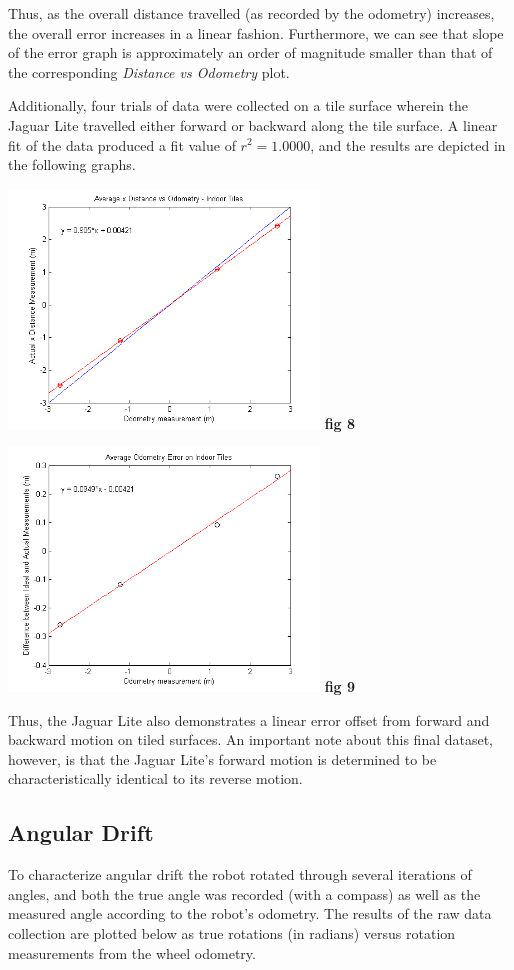 \documentclass[conference]{IEEEtran}
\begin{document}
Thus, as the overall distance travelled (as recorded by the odometry) increases, 
the overall error increases in a linear fashion. Furthermore, we can see that 
slope of the error graph is approximately an order of magnitude smaller than that of 
the corresponding \emph{Distance vs Odometry} plot. 


Additionally, four trials of data were collected on a tile surface wherein the 
Jaguar Lite travelled either forward or backward along the tile surface.  
A linear fit of the data produced a fit value of $r^2 = 1.0000$, and the 
results are depicted in the following graphs. 

\includegraphics[width=3.25in]{tiles_average.png}
\textbf{fig 8}



\includegraphics[width=3.25in]{tiles_error.png}
\textbf{fig 9}

Thus, the Jaguar Lite also demonstrates a linear error offset from forward and 
backward motion on tiled surfaces. An important note about this final dataset, 
however, is that the Jaguar Lite's forward motion is determined to be 
characteristically identical to its reverse motion. 

\subsection{Angular Drift}
  To characterize angular drift the robot rotated through several 
iterations of angles, and both the true angle was recorded (with a 
compass) as well as the measured angle according to the robot's odometry. The 
results of the raw data collection are plotted below as true rotations (in 
radians) versus rotation measurements from the wheel odometry.
\end{document}
